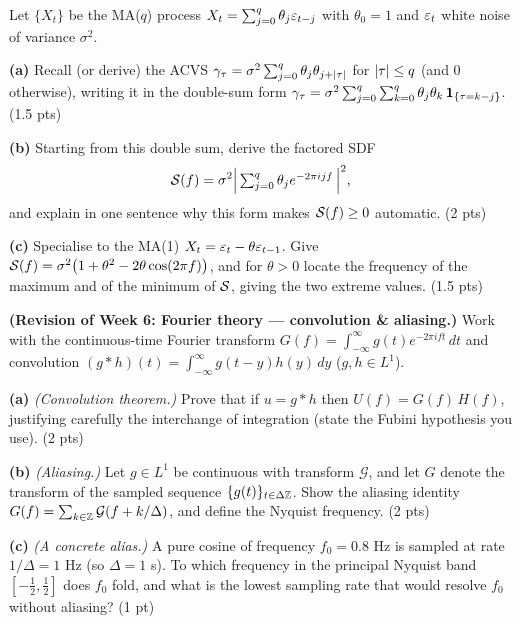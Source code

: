\documentclass[11pt]{article}
\begin{document}
Let $\{X_t\}$ be the MA($q$) process $X_t=\sum_{j=0}^{q}\theta_j\varepsilon_{t-j}$ with $\theta_0=1$ and $\varepsilon_t$ white noise of variance $\sigma^2$.

\textbf{(a)} Recall (or derive) the ACVS $\gamma_\tau=\sigma^2\sum_{j=0}^{q}\theta_j\theta_{j+\left\lvert \tau \right\rvert}$ for $\left\lvert \tau \right\rvert\le q$ (and $0$ otherwise), writing it in the double-sum form $\gamma_\tau=\sigma^2\sum_{j=0}^{q}\sum_{k=0}^{q}\theta_j\theta_k\,\mathbf{1}_{\{\tau=k-j\}}$. \hfill(1.5 pts)

\textbf{(b)} Starting from this double sum, derive the factored SDF
\[
\mathcal{S}(f)=\sigma^2\Bigl|\,\textstyle\sum_{j=0}^{q}\theta_j e^{-2\pi i j f}\,\Bigr|^2,
\]
and explain in one sentence why this form makes $\mathcal{S}(f)\ge0$ automatic. \hfill(2 pts)

\textbf{(c)} Specialise to the MA(1) $X_t=\varepsilon_t-\theta\varepsilon_{t-1}$. Give $\mathcal{S}(f)=\sigma^2\bigl(1+\theta^2-2\theta\cos(2\pi f)\bigr)$, and for $\theta>0$ locate the frequency of the maximum and of the minimum of $\mathcal{S}$, giving the two extreme values. \hfill(1.5 pts)
\answerpage

\textbf{(Revision of Week 6: Fourier theory --- convolution \& aliasing.)} Work with the continuous-time Fourier transform $G(f)=\int_{-\infty}^{\infty}g(t)e^{-2\pi i f t}\,dt$ and convolution $(g*h)(t)=\int_{-\infty}^{\infty}g(t-y)h(y)\,dy$ ($g,h\in L^1$).

\textbf{(a)} \emph{(Convolution theorem.)} Prove that if $u=g*h$ then $U(f)=G(f)\,H(f)$, justifying carefully the interchange of integration (state the Fubini hypothesis you use). \hfill(2 pts)

\textbf{(b)} \emph{(Aliasing.)} Let $g\in L^1$ be continuous with transform $\mathcal G$, and let $G$ denote the transform of the sampled sequence $\{g(t)\}_{t\in\Delta\mathbb{Z}}$. Show the aliasing identity $G(f)=\sum_{k\in\mathbb{Z}}\mathcal G(f+k/\Delta)$, and define the Nyquist frequency. \hfill(2 pts)

\textbf{(c)} \emph{(A concrete alias.)} A pure cosine of frequency $f_0=0.8$ Hz is sampled at rate $1/\Delta=1$ Hz (so $\Delta=1$ s). To which frequency in the principal Nyquist band $[-\tfrac12,\tfrac12]$ does $f_0$ fold, and what is the lowest sampling rate that would resolve $f_0$ without aliasing? \hfill(1 pt)
\answerpage
\end{document}
